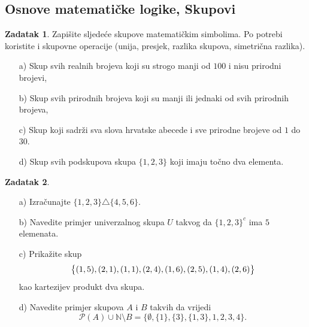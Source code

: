 \documentclass{book}
\let\originalleft\left
\let\originalright\right
\renewcommand{\left}{\mathopen{}\mathclose\bgroup\originalleft}
\renewcommand{\right}{\aftergroup\egroup\originalright}
\theoremstyle{definition}
\theoremstyle{definition}
\newtheorem{exercise}{Zadatak}
\theoremstyle{remark}
\begin{document}
\subsection*{Osnove matematičke logike, Skupovi}
\begin{exercise} Zapišite sljedeće skupove matematičkim simbolima. Po potrebi koristite i skupovne operacije (unija, presjek, razlika skupova, simetrična razlika).
\begin{itemize}
\item[a)] Skup svih realnih brojeva koji su strogo manji od $100$ i nisu prirodni brojevi,
\item[b)] Skup svih prirodnih brojeva koji su manji ili jednaki od svih prirodnih brojeva,
\item[c)] Skup koji sadrži sva slova hrvatske abecede i sve prirodne brojeve od $1$ do $30$.
\item[d)] Skup svih podskupova skupa $\{1, 2, 3\}$ koji imaju točno dva elementa.
\end{itemize}
\end{exercise}
\begin{exercise} \textbf{}
\begin{itemize}
\item[a)] Izračunajte $\{1, 2, 3\}\triangle\{4, 5, 6\}$.
\item[b)] Navedite primjer univerzalnog skupa $U$ takvog da $\{1, 2, 3\}^c$ ima $5$ elemenata.
\item[c)] Prikažite skup
$$\left\{(1, 5), (2, 1), (1, 1), (2, 4), (1, 6), (2, 5), (1, 4), (2, 6)\right\}$$
kao kartezijev produkt dva skupa.
\item[d)] Navedite primjer skupova $A$ i $B$ takvih da vrijedi $$\mathcal{P}(A)\cup \mathbb{N}\setminus B=\{\emptyset, \{1\}, \{3\}, \{1, 3\}, 1, 2,3, 4\}.$$
\end{itemize}
\end{exercise}
\end{document}
